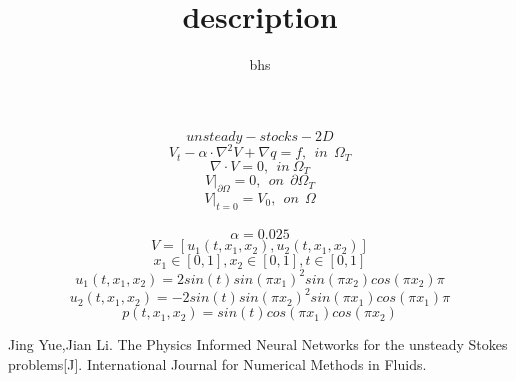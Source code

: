 \documentclass[12pt]{amsart}
\title{description}
\author{bhs}
\begin{document}
\maketitle

$$unsteady-stocks-2D$$
$$V_{t}- \alpha \cdot \nabla^{2} V+ \nabla q  = f,\ \  in \ \ \Omega_{T}$$
$$\nabla \cdot  V=0,\ \ in \ \Omega_{T}$$
$$V |_{\partial\Omega}=0,\ \ on \ \ \partial\Omega_{T}$$
$$V |_{t=0}=V_{0},\ \ on \ \ \Omega$$ \\
$$\alpha=0.025$$
$$V=[u_{1}(t,x_{1},x_{2}),u_{2}(t,x_{1},x_{2})]$$
$$x_{1}\in [0,1] ,x_{2} \in [0,1],t \in [0,1]$$
$$u_{1}(t,x_{1},x_{2})=2sin(t)sin(\pi x_{1})^{2}sin(\pi x_{2})cos(\pi x_{2})\pi$$
$$u_{2}(t,x_{1},x_{2})=-2sin(t)sin(\pi x_{2})^{2}sin(\pi x_{1})cos(\pi x_{1})\pi$$
$$p(t,x_{1},x_{2})=sin(t)cos(\pi x_{1})cos(\pi x_{2})$$


\begin{thebibliography}{10}
Jing Yue,Jian Li. The Physics Informed Neural Networks for the unsteady Stokes problems[J]. International Journal for Numerical Methods in Fluids.
\end{thebibliography}
\end{document}
